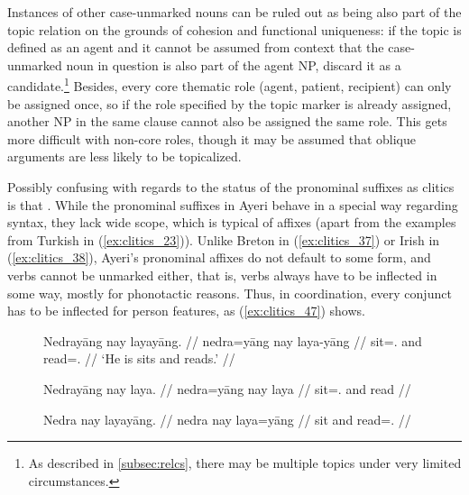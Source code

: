 Instances of other case-unmarked nouns can be ruled out as being also part of
the topic relation on the grounds of cohesion and functional uniqueness: if the
topic is defined as an agent and it cannot be assumed from context that the
case-unmarked noun in question is also part of the agent NP, discard it as a
candidate.\footnote{As described in \autoref{subsec:relcs}, there may be
multiple topics under very limited circumstances.} Besides, every core thematic
role (agent, patient, recipient) can only be assigned once, so if the role
specified by the topic marker is already assigned, another NP in the same
clause cannot also be assigned the same role. This gets more difficult with
non-core roles, though it may be assumed that oblique arguments are less likely
to be topicalized.

Possibly confusing with regards to the status of the pronominal suffixes as
cli\-tics is that .
While the pronominal suffixes in Ayeri behave in a special way regarding
syntax, they lack wide scope, which is typical of affixes (apart from the
examples from Turkish in (\ref{ex:clitics_23})). Unlike Breton in
(\ref{ex:clitics_37}) or Irish in (\ref{ex:clitics_38}), Ayeri's pronominal
affixes do not default to some form, and verbs cannot be unmarked either, that
is, verbs always have to be inflected in some way, mostly for phonotactic
reasons. Thus, in coordination, every conjunct has to be inflected for person
features, as (\ref{ex:clitics_47}) shows.

\begin{figure}[h]
\pex\label{ex:clitics_47}
\a\label{ex:clitics_47a}\begingl
	\gla Nedrayāng nay layayāng. //
	\glb nedra=yāng nay laya-yāng //
	\glc sit=\TsgM{}.\Aarg{} and read=\TsgM{}.\Aarg{} //
	\glft `He is sits and reads.' //
\endgl

\a\label{ex:clitics_47b}\ljudge{*}\begingl
	\gla Nedrayāng nay laya. //
	\glb nedra=yāng nay laya //
	\glc sit=\TsgM{}.\Aarg{} and read //
\endgl

\a\label{ex:clitics_47c}\ljudge{*}\begingl
	\gla Nedra nay layayāng. //
	\glb nedra nay laya=yāng //
	\glc sit and read=\TsgM{}.\Aarg{} //
\endgl
\xe
\end{figure}

